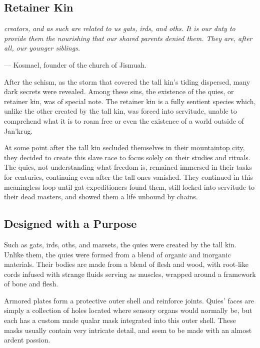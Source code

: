 \begin{linenumbers}

\section{Retainer Kin}
\textit{creators, and as such are related to us gats, irds, and oths.
It is our duty to provide them the nourishing that our shared parents denied them.
They are, after all, our younger siblings.}

\hspace*{\fill} --- Kosmael, founder of the church of Jismuah.

After the schism, as the storm that covered the tall kin's tiding dispersed, many dark secrets were revealed.
Among these sins, the existence of the quies, or retainer kin, was of special note.
The retainer kin is a fully sentient species which, unlike the other created by the tall kin, was forced into servitude, unable to comprehend what it is to roam free or even the existence of a world outside of Jan'krug.

At some point after the tall kin secluded themselves in their mountaintop city, they decided to create this slave race to focus solely on their studies and rituals.
The quies, not understanding what freedom is, remained immersed in their tasks for centuries, continuing even after the tall ones vanished.
They continued in this meaningless loop until gat expeditioners found them, still locked into servitude to their dead masters, and showed them a life unbound by chains.

\subsection*{Designed with a Purpose}
Such as gats, irds, oths, and marsets, the quies were created by the tall kin.
Unlike them, the quies were formed from a blend of organic and inorganic materials.
Their bodies are made from a blend of flesh and wood, with root-like cords infused with strange fluids serving as muscles, wrapped around a framework of bone and flesh.

Armored plates form a protective outer shell and reinforce joints.
Quies' faces are simply a collection of holes located where sensory organs would normally be, but each has a custom made qualar mask integrated into this outer shell.
These masks usually contain very intricate detail, and seem to be made with an almost ardent passion.


\end{linenumbers}
